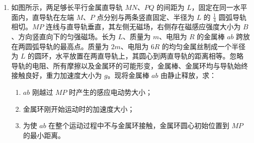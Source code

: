 \documentclass[\gkver]{gaokaozhenti}
\begin{document}
\begin{enumerate}
{其中 $ v = 5 \Ums $，$ v_{1} = -1 \Ums $

解得 $ v_{2} = 3 \Ums $

小物块与小球碰撞过程中，两者构成的系统损失的总动能为 $ \Delta E_{\mathrm{k}} = \frac{1}{2} m_{\text{物}} v^{2} - \frac{1}{2} m_{\text{物}} v_{1}^{2} - \frac{1}{2} m_{\text{球}} v_{2}^{2} $

解得 $ \Delta E_{k} = 0.3 \UJ $

（3）若小球运动到 $ P $ 点正上方，绳子恰好不松弛，设此时 $ P $ 点到 $ O $ 点的距离为 $ d $，小球在 $ P $ 点正上方的速度为 $ v_{3} $，在 $ P $ 点正上方，由牛顿第二定律有 $ m_{\text{球}}g = m_{\text{球}}\frac{v_{3}^{2}}{L_{\text{绳}}-d} $

小球从 $ O $ 点正下方到 $ P $ 点正上方过程中，由机械能守恒定律有 $ \frac{1}{2}m_{\text{球}}v_{2}^{2} = \frac{1}{2}m_{\text{球}}v_{3}^{2} + m_{\text{球}}g\left(2L_{\text{绳}}-d\right) $

联立解得 $ d = 0.2 \Um $

即 $ P $ 点到 $ O $ 点的最小距离为 $ 0.2 \Um $。
}
\item
如图所示，两足够长平行金属直导轨 $ MN $、$ PQ $ 的间距为 $ L $，固定在同一水平面内，直导轨在左端 $ M $、$ P $ 点分别与两条竖直固定、半径为 $ L $ 的 $ \frac{1}{4} $ 圆弧导轨相切。$ MP $ 连线与直导轨垂直，其左侧无磁场，右侧存在磁感应强度大小为 $ B $、方向竖直向下的匀强磁场。长为 $ L $、质量为 $ m $、电阻为 $ R $ 的金属棒 $ ab $ 跨放在两圆弧导轨的最高点。质量为 $ 2 m $、电阻为 $ 6 R $ 的均匀金属丝制成一个半径为 $ L $ 的圆环，水平放置在两直导轨上，其圆心到两直导轨的距离相等。忽略导轨的电阻、所有摩擦以及金属环的可能形变，金属棒、金属环均与导轨始终接触良好，重力加速度大小为 $ g $。现将金属棒 $ ab $ 由静止释放，求：
\begin{enumerate}
	\item 
	$ ab $ 刚越过 $ MP $ 时产生的感应电动势大小；
	
	\item
	金属环刚开始运动时的加速度大小；
	
	\item
	为使 $ ab $ 在整个运动过程中不与金属环接触，金属环圆心初始位置到 $ MP $ 的最小距离。
\end{enumerate}
\end{enumerate}
\end{document}
